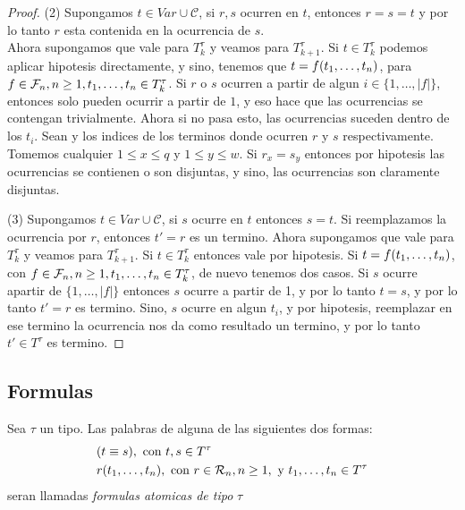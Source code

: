 \begin{proof}
  (2) Supongamos $t \in Var \cup \mathcal{C}$, si $r, s$ ocurren en $t$, entonces $r=s=t$ y por lo tanto $r$ esta contenida en la ocurrencia de $s$.\\
  Ahora supongamos que vale para $T^\tau_{k}$ y veamos para $T^\tau_{k+1}$. Si $t\in T^\tau_{k}$ podemos aplicar hipotesis directamente, y sino, tenemos que 
  $t=f(t_{1}, \dots, t_{n})$, para $f\in\mathcal{F}_n,n\geq1,t_{1}, \dots, t_{n}\in T^\tau_k$. Si $r$ o $s$ ocurren a partir de algun $i\in\{1,\dots,|f|\}$, entonces
  solo pueden ocurrir a partir de $1$, y eso hace que las ocurrencias se contengan trivialmente. Ahora si no pasa esto, las ocurrencias suceden dentro de los $t_i$. Sean 
   y  los indices de los terminos donde ocurren $r$ y $s$ respectivamente. Tomemos cualquier $1\leq x\leq q$ y $1\leq y\leq w$. Si $r_x = s_y$ entonces 
  por hipotesis las ocurrencias se contienen o son disjuntas, y sino, las ocurrencias son claramente disjuntas.

  (3) Supongamos $t\in Var \cup \mathcal{C}$, si $s$ ocurre en $t$ entonces $s = t$. Si reemplazamos la ocurrencia por $r$, entonces $t' = r$ es un termino.
  Ahora supongamos que vale para $T^\tau_k$ y veamos para $T^\tau_{k+1}$. Si $t\in T^\tau_k$ entonces vale por hipotesis. Si $t=f(t_{1}, \dots, t_{n})$, 
  con $f\in\mathcal{F}_n, n\geq1, t_{1}, \dots, t_{n}\in T^\tau_k$, de nuevo tenemos dos casos. Si $s$ ocurre apartir de $\{1,\dots,|f|\}$
  entonces $s$ ocurre a partir de 1, y por lo tanto $t=s$, y por lo tanto $t'=r$ es termino. Sino, $s$ ocurre en algun $t_i$, y por hipotesis, reemplazar en ese termino la ocurrencia nos da como resultado un termino,
  y por lo tanto $t'\in T^\tau$ es termino.

\end{proof}

\subsection{Formulas}

\begin{definition}
  Sea $\tau$ un tipo. Las palabras de alguna de las siguientes dos formas:
  \begin{alignat*}{3}
    &(t \equiv s), \text{ con } t, s \in T^\tau\\
    &r(t_{1}, \dots, t_{n}), \text{ con } r \in \mathcal{R}_n, n \geq 1, \text{ y } t_{1}, \dots, t_{n} \in T^\tau
  \end{alignat*}
  seran llamadas \emph{formulas atomicas de tipo} $\tau$
\end{definition}

